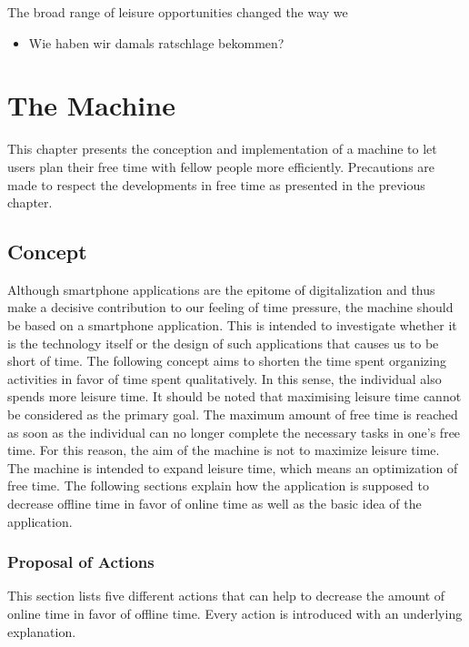 \documentclass[12pt,numbers=noenddot,parskip,bibliography=totocnumbered,listof=totocnumbered]{scrreprt}
\begin{document}
The broad range of leisure opportunities changed the way we

\begin{itemize} 
	\item Wie haben wir damals ratschlage bekommen?
	\end{itemize} 


\chapter{The Machine}
This chapter presents the conception and implementation of a machine to let users plan their free time with fellow people more efficiently. Precautions are made to respect the developments in free time as presented in the previous chapter.

\section{Concept}
Although smartphone applications are the epitome of digitalization and thus make a decisive contribution to our feeling of time pressure, the machine should be based on a smartphone application. This is intended to investigate whether it is the technology itself or the design of such applications that causes us to be short of time. The following concept aims to shorten the time spent organizing activities in favor of time spent qualitatively. In this sense, the individual also spends more leisure time. It should be noted that maximising leisure time cannot be considered as the primary goal. The maximum amount of free time is reached as soon as the individual can no longer complete the necessary tasks in one's free time. For this reason, the aim of the machine is not to maximize leisure time. The machine is intended to expand leisure time, which means an optimization of free time. The following sections explain how the application is supposed to decrease offline time in favor of online time as well as the basic idea of the application.

\subsection{Proposal of Actions}
This section lists five different actions that can help to decrease the amount of online time in favor of offline time. Every action is introduced with an underlying explanation.
\end{document}
